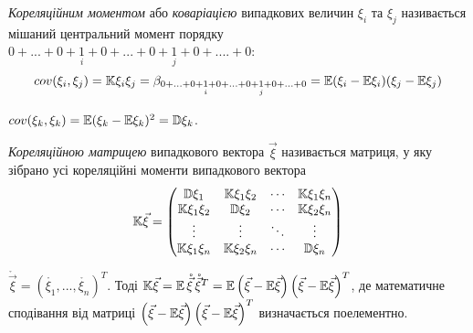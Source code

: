 \begin{definition}
    \emph{Кореляційним моментом} або 
    \emph{коваріацією} випадкових величин 
    $\xi_i$ та $\xi_j$ називається мішаний 
    центральний момент 
    порядку
    $0+...+0+\underset{i}{1}+0+...+0+\underset{j}{1}+0+....+0$:
    \begin{equation*}
        {cov}(\xi_i,\xi_j) = \mathbb{K}\xi_i\xi_j = \beta_{0+...+0+\underset{i}{1}+0+...
        +0+\underset{j}{1}+0+...+0}
        =
        \mathbb{E}(\xi_i-\mathbb{E}\xi_i)(\xi_j-\mathbb{E}\xi_j)
    \end{equation*}
\end{definition}
\begin{remark}
    ${cov}(\xi_k, \xi_k) = \mathbb{E}(\xi_k-\mathbb{E}\xi_k)^2 = \mathbb{D}\xi_k$.
\end{remark}
\begin{definition}
   \emph{Кореляційною матрицею} випадкового 
   вектора $\vec{\xi}$ називається матриця, у яку зібрано усі 
   кореляційні моменти випадкового вектора
   \begin{equation*}
       \mathbb{K}\vec{\xi} = 
       \begin{pmatrix}
           \mathbb{D}\xi_1 & \mathbb{K}\xi_1\xi_2 & \cdots & \mathbb{K}\xi_1\xi_n \\
           \mathbb{K}\xi_1\xi_2 & \mathbb{D}\xi_2 & \cdots & \mathbb{K}\xi_2\xi_n \\
           \vdots & \vdots & \ddots & \vdots \\
           \mathbb{K}\xi_1\xi_n & \mathbb{K}\xi_2\xi_n & \cdots & \mathbb{D}\xi_n
       \end{pmatrix}
   \end{equation*} 
\end{definition}
\begin{remark}
    $\mathring{\vec{\xi}} = \left(\mathring{\xi_1}, ..., \mathring{\xi_n}
    \right)^T$.
    Тоді $\mathbb{K}\vec{\xi} = \mathbb{E}\,\mathring{\vec{\xi}}\,\mathring{\vec{\xi}}^T = \mathbb{E} \left(\vec{\xi} - \mathbb{E}\vec{\xi}\right)\left(\vec{\xi} - \mathbb{E}\vec{\xi}\right)^T$,
    де математичне сподівання від матриці $\left(\vec{\xi} - \mathbb{E}\vec{\xi}\right)\left(\vec{\xi} - \mathbb{E}\vec{\xi}\right)^T$ визначається поелементно.
\end{remark}

